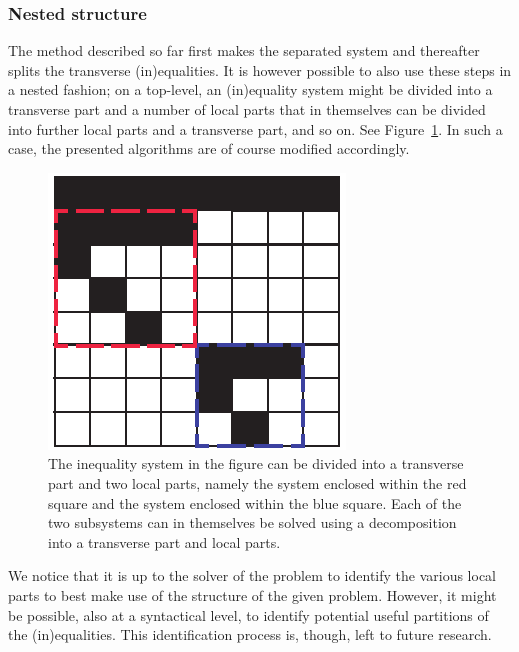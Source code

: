 \subsubsection*{Nested structure}\label{sec:nested}
The method described so far first makes the separated system and thereafter splits the transverse (in)equalities. It is however possible to also use these steps in a nested fashion; on a top-level, an (in)equality system might be divided into a transverse part and a number of local parts that in themselves can be divided into further local parts and a transverse part, and so on. See Figure~\ref{fig:decompBigger}. In such a case, the presented algorithms are of course modified accordingly. 

\begin{figure}[htbp]
	\centering
		\includegraphics{figures/decompBigger.pdf}
	\caption{The inequality system in the figure can be divided into a transverse part and two local parts, namely the system enclosed within the red square and the system enclosed within the blue square. Each of the two subsystems can in themselves be solved using a decomposition into a transverse part and local parts.}
	\label{fig:decompBigger}
\end{figure}

We notice that it is up to the solver of the problem to identify the various local parts to best make use of the structure of the given problem.
However, it might be possible, also at a syntactical level, to identify potential useful partitions of the (in)equalities. This identification process is, though, left to future research. 

